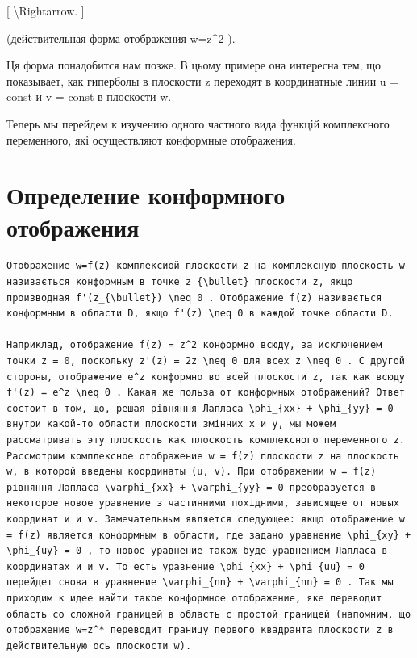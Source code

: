 \documentclass[
]{article}
\begin{document}
{[} \textbackslash Rightarrow. {]}

(действительная форма отображения w=z\^{}2 ).

Ця форма понадобится нам позже. В цьому примере она интересна тем, що
показывает, как гиперболы в плоскости z переходят в координатные линии u
= const и v = const в плоскости w.

Теперь мы перейдем к изучению одного частного вида функцій комплексного
переменного, які осуществляют конформные отображения.

\section{Определение конформного
отображения}\label{ux43eux43fux440ux435ux434ux435ux43bux435ux43dux438ux435-ux43aux43eux43dux444ux43eux440ux43cux43dux43eux433ux43e-ux43eux442ux43eux431ux440ux430ux436ux435ux43dux438ux44f}

\begin{verbatim}
Отображение w=f(z) комплексиой плоскости z на комплексную плоскость w називається конформным в точке z_{\bullet} плоскости z, якщо производная f'(z_{\bullet}) \neq 0 . Отображение f(z) називається конформным в области D, якщо f'(z) \neq 0 в каждой точке области D.

Наприклад, отображение f(z) = z^2 конформно всюду, за исключением точки z = 0, поскольку z'(z) = 2z \neq 0 для всех z \neq 0 . C другой стороны, отображение e^z конформно во всей плоскости z, так как всюду f'(z) = e^z \neq 0 . Какая же польза от конформных отображений? Ответ состоит в том, що, решая рівняння Лапласа \phi_{xx} + \phi_{yy} = 0 внутри какой-то области плоскости змінних x и y, мы можем рассматривать эту плоскость как плоскость комплексного переменного z. Рассмотрим комплексное отображение w = f(z) плоскости z на плоскость w, в которой введены координаты (u, v). При отображении w = f(z) рівняння Лапласа \varphi_{xx} + \varphi_{yy} = 0 преобразуется в некоторое новое уравнение з частинними похідними, зависящее от новых координат и и v. Замечательным является следующее: якщо отображение w = f(z) является конформным в области, где задано уравнение \phi_{xy} + \phi_{uy} = 0 , то новое уравнение також буде уравнением Лапласа в координатах и и v. To есть уравнение \phi_{xx} + \phi_{uu} = 0 перейдет снова в уравнение \varphi_{nn} + \varphi_{nn} = 0 . Так мы приходим к идее найти такое конформное отображение, яке переводит область со сложной границей в область с простой границей (напомним, що отображение w=z^* переводит границу первого квадранта плоскости z в действительную ось плоскости w).
\end{verbatim}
\end{document}
